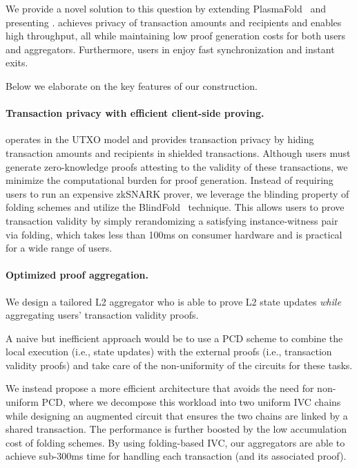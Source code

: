 \documentclass[a4paper,10pt]{article}
\begin{document}
We provide a novel solution to this question by extending PlasmaFold~\cite{cryptoeprint:2025/1300} and presenting \Protocol.
\Protocol achieves privacy of transaction amounts and recipients and enables high throughput, all while maintaining low proof generation costs for both users and aggregators.
Furthermore, users in \Protocol enjoy fast synchronization and instant exits.

Below we elaborate on the key features of our construction.

\paragraph{Transaction privacy with efficient client-side proving.}
\Protocol operates in the \ac{UTXO} model and provides transaction privacy by hiding transaction amounts and recipients in shielded transactions.
Although users must generate zero-knowledge proofs attesting to the validity of these transactions, we minimize the computational burden for proof generation.
Instead of requiring users to run an expensive \ac{zkSNARK} prover, we leverage the blinding property of folding schemes and utilize the BlindFold~\cite{C:KotSet24} technique.
This allows users to prove transaction validity by simply rerandomizing a satisfying instance-witness pair via folding, which takes less than 100ms on consumer hardware and is practical for a wide range of users.

\paragraph{Optimized proof aggregation.}
We design a tailored \ac{L2} aggregator who is able to prove \ac{L2} state updates \textit{while} aggregating users' transaction validity proofs.

A naive but inefficient approach would be to use a \ac{PCD} scheme to combine the local execution (i.e., state updates) with the external proofs (i.e., transaction validity proofs) and take care of the non-uniformity of the circuits for these tasks.

We instead propose a more efficient architecture that avoids the need for non-uniform \ac{PCD}, where we decompose this workload into two uniform \ac{IVC} chains while designing an augmented circuit that ensures the two chains are linked by a shared transaction.
The performance is further boosted by the low accumulation cost of folding schemes.
By using folding-based \ac{IVC}, our aggregators are able to achieve sub-300ms time for handling each transaction (and its associated proof).
\end{document}
